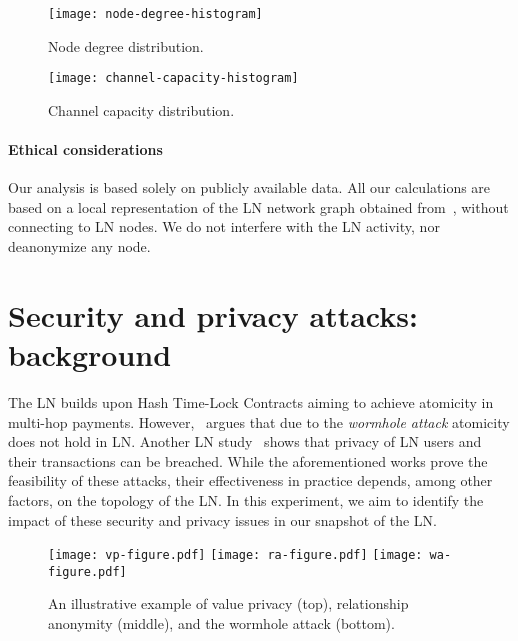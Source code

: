 \begin{figure}[tb]
	\centering
	\texttt{[image: node-degree-histogram]}
	\caption{Node degree distribution.}
	\label{fig:node-degree-histogram}
\end{figure}

\begin{figure}[tb]
	\centering
	\texttt{[image: channel-capacity-histogram]}
	\caption{Channel capacity distribution.}
	\label{fig:channel-capacity-histogram}
\end{figure}

\paragraph{Ethical considerations} 
Our analysis is based solely on publicly available data.
All our calculations are based on a local representation of the LN network graph obtained from~\cite{fiatjaf2020}, without connecting to LN nodes.
We do not interfere with the LN activity, nor deanonymize any node.


\section{Security and privacy attacks: background}
\label{sec:sec-priv-attacks}

The LN builds upon Hash Time-Lock Contracts aiming to achieve atomicity in multi-hop payments.
However,~\cite{Malavolta2019} argues that due to the \emph{wormhole attack} atomicity does not hold in LN\@.
Another LN study~\cite{Malavolta2017} shows that privacy of LN users and their transactions can be breached.
While the aforementioned works prove the feasibility of these attacks, their effectiveness in practice depends, among other factors, on the topology of the LN\@.
In this experiment, we aim to identify the impact of these security and privacy issues in our snapshot of the LN\@.

\begin{figure*}[tb]
	\texttt{[image: vp-figure.pdf]}
	\vspace{0.3cm}
	\texttt{[image: ra-figure.pdf]}
	\vspace{0.3cm}
	\texttt{[image: wa-figure.pdf]}
	\caption{An illustrative example of value privacy (top), relationship anonymity (middle), and the wormhole attack (bottom).}
	\label{fig:wormhole-attack}
\end{figure*}

